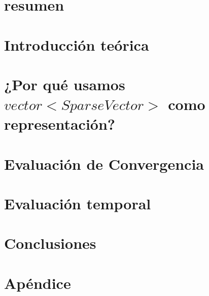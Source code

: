 


 



\section*{resumen}


\vspace{2em}
\tableofcontents
\newpage

\section{Introducción teórica}

\newpage

\section{¿Por qué usamos $vector<SparseVector>$ como representación?}

\newpage

\section{Evaluación de Convergencia}

\newpage

\section{Evaluación temporal}

\newpage

\section{Conclusiones}

\newpage

\section{Apéndice}


%
%



